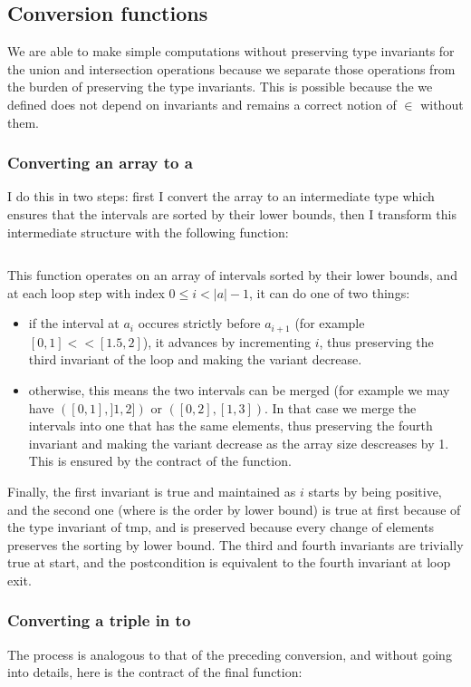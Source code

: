 \subsection{Conversion functions}\label{q9-11:conv}
We are able to make simple computations without preserving type invariants for the
union and intersection operations because we separate those operations from
the burden of preserving the type invariants. This is possible because the  we
defined does not depend on invariants and remains a correct notion of $\in$ without
them.

\subsubsection{Converting an array to a }

I do this in two steps: first I convert the array to an intermediate type
 which ensures that the intervals are sorted by their lower
bounds, then I transform this intermediate structure with the following function:
%
\inputminted{\whyml}{why3code/lax_to_strict.mlw}
%

This function operates on an array of intervals sorted by their lower bounds, and at
each loop step with index $0\le i < |a| - 1$, it can do one of two things:
\begin{itemize}
  \item if the interval at $a_i$ occures strictly before $a_{i+1}$ (for example
    $[0,1] << [1.5,2]$), it advances by incrementing $i$, thus preserving the
    third invariant of the loop and making the variant decrease.
  \item otherwise, this means the two intervals can be merged (for example we may
    have $([0,1],]1,2])$ or $([0,2],[1,3])$. In that case we merge the intervals into
    one that has the same elements, thus preserving the fourth invariant and making
    the variant decrease as the array size descreases by 1.
    This is ensured by the contract of the  function.
\end{itemize}
Finally, the first invariant is true and maintained as $i$ starts by being positive, and
the second one (where \minline{<==} is the order by lower bound) is true at first
because of the type invariant of tmp, and is preserved because every change of
elements preserves the sorting by lower bound. The third and fourth invariants are
trivially true at start, and the postcondition is equivalent to the fourth invariant
at loop exit.


\subsubsection{Converting a triple in 
  to }
The process is analogous to that of the preceding conversion, and without going into
details, here is the contract of the final function:
%
\inputminted{\whyml}{why3code/fix_untyped.mlw}
